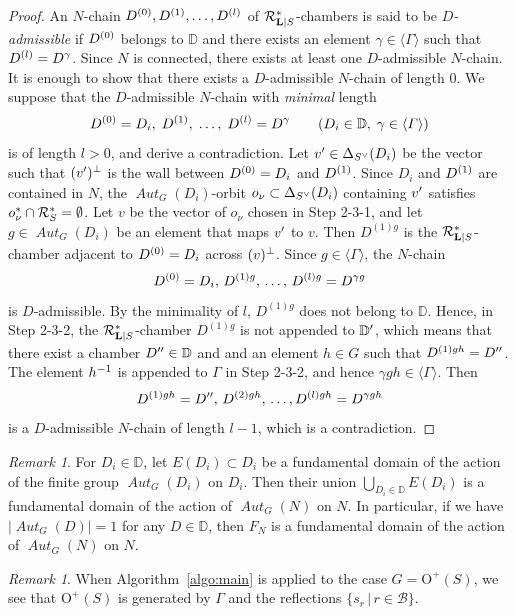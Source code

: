 \documentclass{amsart}
\theoremstyle{plain}
\theoremstyle{definition}
\theoremstyle{remark}
\newtheorem{remark}[theorem]{Remark}
\numberwithin{equation}{section}
\numberwithin{table}{section}
\numberwithin{figure}{section}
\newcommand{\D}{\mathord{\mathbb D}}
\newcommand{\BBB}{\mathord{\mathcal B}}
\newcommand{\RRR}{\mathord{\mathcal R}}
\newcommand{\shortset}[2]{\{ {#1} \,|\, {#2}   \}}
\newcommand{\gen}[1]{\langle {#1}  \rangle}
\newcommand{\inv}{\sp{-1}}
\newcommand{\sprime}{\sp\prime}
\newcommand{\spar}[1]{\sp{(#1)}}
\newcommand{\spprime}{\sp{\prime\prime}}
\newcommand{\sperp}{\sp{\perp}}
\newcommand{\dual}{\sp{\vee}}
\newcommand{\OG}{\mathord{\mathrm {O}}}
\renewcommand{\L}{\mathord{\mathbf{L}}}
\newcommand{\aut}{\operatorname{\mathit {Aut}}\nolimits}
\newcommand{\autG}{\aut_G}
\newcommand{\Chams}{\D}
\newcommand{\Roots}{\RRR}
\newcommand{\sphyp}{\sp*}
\newcommand{\RtsLS}{\Roots_{\L|S}}
\newcommand{\Nc}{N}
\begin{document}
\begin{proof}
An $\Nc$-chain $D\spar{0}, D\spar{1}, \dots, D\spar{l}$ of $\RtsLS\sphyp$-chambers 
is said to be \emph{$D$-admissible} if $D\spar{0}$ belongs to $\Chams$
and there exists  an element  $\gamma\in \gen{\varGamma}$ such that $D\spar{l}=D^{\gamma}$.
Since  $\Nc$ is connected, 
there exists at least one  $D$-admissible $\Nc$-chain.
It is enough to show that
there exists a $D$-admissible $\Nc$-chain of  length $0$.
We suppose that the  $D$-admissible $\Nc$-chain with \emph{minimal} length 
$$
D\spar{0}=D_i, \; D\spar{1}, \; \dots, \; D\spar{l}=D^{\gamma}\qquad(D_i\in \Chams, \; \gamma\in \gen{\varGamma})
$$
is of length $l>0$, and 
derive a contradiction.
Let $v\sprime\in \Delta_{S\dual}(D_i)$ be the vector such that $(v\sprime)\sperp$ is the wall between 
$D\spar{0}=D_i$ and $D\spar{1}$.
Since $D_i$ and $D\spar{1}$ are contained in $\Nc$,
the $\autG(D_i)$-orbit
 $o_{\nu}\subset \Delta_{S\dual}(D_i)$   containing $v\sprime$
 satisfies $o_{\nu}\sphyp\cap \Roots_{S}\sphyp=\emptyset$.
Let $v$ be the  vector of 
 $o_{\nu}$ chosen in Step 2-3-1,
and let $g\in \autG(D_i)$ be an element that maps $v\sprime$ to $v$.
Then $D^{(1)g}$ is the $\RtsLS\sphyp$-chamber adjacent to $D\spar{0}=D_i$
across $(v)\sperp$.
Since $g\in \gen{\varGamma}$, 
the $\Nc$-chain
$$
D\spar{0}=D_i, \, D^{(1)g}, \, \dots, \, D^{(l)g}=D^{\gamma g}
$$
is $D$-admissible.
By the minimality of $l$,
$D^{(1) g}$ does not belong to  $\Chams$.
Hence, in Step 2-3-2, the  $\RtsLS\sphyp$-chamber
$D^{(1) g}$ is not appended to $\Chams\sprime$,
which means that there exist a chamber $D\spprime\in\Chams$ and and an element $h\in G$
such that $D\sp{(1) g h}=D\spprime$.
The element  $h\inv$ is appended to $\varGamma$ in Step 2-3-2,
and hence $\gamma  g h\in \gen{\varGamma}$.
Then
$$
D^{(1) g h}=D\spprime, \, D^{(2) g h}, \, \dots, D^{(l) g h}=D^{\gamma g h}
$$
is a $D$-admissible $\Nc$-chain of length $l-1$,
which is a contradiction.
\end{proof}
%
\begin{remark}\label{rem:weakfund}
For $D_i\in \Chams$,
let $E(D_i)\subset D_i$ be a fundamental domain of the action of the finite group $\aut_{G}(D_i)$
on $D_i$. 
Then their union $\bigcup_{D_i\in \Chams} E(D_i)$
is a fundamental domain of the action of $\aut_{G}(\Nc)$ on $\Nc$.
In particular,
if we have $|\aut_{G}(D)|=1$ for any $D\in \Chams$, 
then $F_{\Nc}$ is a fundamental domain of the action of $\aut_{G}(\Nc)$ on $\Nc$.
\end{remark}
%
\begin{remark}
When 
 Algorithm~\ref{algo:main} is applied to the case $G=\OG^+(S)$, we see that $\OG^+(S)$
is generated by $\varGamma$ and the reflections $\shortset{s_r}{r\in \BBB}$.
\end{remark}
\end{document}
